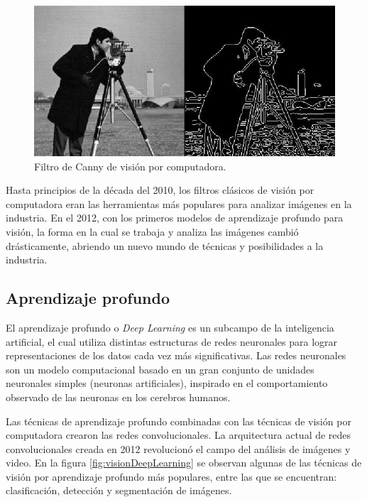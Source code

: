 \begin{figure}[ht]
	\centering
	\includegraphics[scale=.55]{./Figures/visionComputadora.jpg}
	\caption{Filtro de Canny de visión por computadora\protect\footnotemark.}
	\label{fig:visionComputadora}
\end{figure}




Hasta principios de la década del 2010, los filtros clásicos de visión por computadora eran las herramientas más populares para analizar imágenes en la industria. En el 2012, con los primeros modelos de aprendizaje profundo para visión, la forma en la cual se trabaja y analiza las imágenes cambió drásticamente, abriendo un nuevo mundo de técnicas y posibilidades a la industria.

\newpage

\subsection{Aprendizaje profundo}

El aprendizaje profundo o \textit{Deep Learning} \citep{DEEP_LEARNING} es un subcampo de la inteligencia artificial, el cual utiliza distintas estructuras de redes neuronales para lograr representaciones de los datos cada vez más significativas. Las redes neuronales son un modelo computacional basado en un gran conjunto de unidades neuronales simples (neuronas artificiales), inspirado en el comportamiento observado de las neuronas en los cerebros humanos. 

Las técnicas de aprendizaje profundo combinadas con las técnicas de visión por computadora crearon las redes convolucionales. La arquitectura actual de redes convolucionales creada en 2012 revolucionó el campo del análisis de imágenes y video. En la figura \ref{fig:visionDeepLearning} se observan algunas de las técnicas de visión por aprendizaje profundo más populares, entre las que se encuentran: clasificación, detección y segmentación de imágenes.

